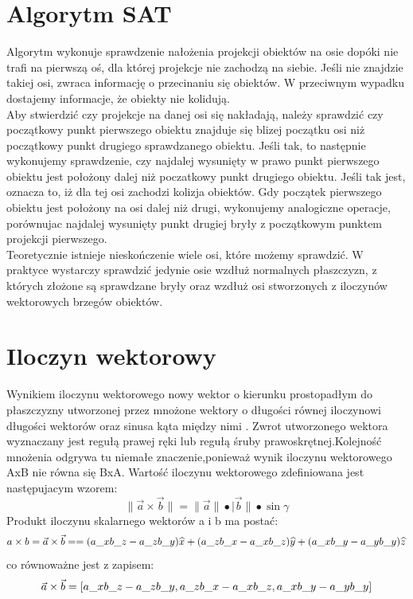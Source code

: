 \section{Algorytm SAT}
Algorytm wykonuje sprawdzenie nałożenia projekcji obiektów na osie dopóki nie trafi na pierwszą oś, dla której projekcje nie zachodzą na siebie. Jeśli nie znajdzie takiej osi, zwraca informację o przecinaniu się obiektów. W przeciwnym wypadku dostajemy informacje, że obiekty nie kolidują. \\
Aby stwierdzić czy projekcje na danej osi się nakładają, należy sprawdzić czy początkowy punkt pierwszego obiektu znajduje się blizej początku osi niż początkowy punkt drugiego sprawdzanego obiektu. Jeśli tak, to następnie wykonujemy sprawdzenie, czy najdalej wysunięty w prawo punkt pierwszego obiektu jest położony dalej niż poczatkowy punkt drugiego obiektu. Jeśli tak jest, oznacza to, iż dla tej osi zachodzi kolizja obiektów. Gdy początek pierwszego obiektu jest położony na osi dalej niż drugi, wykonujemy analogiczne operacje, porównujac najdalej wysunięty punkt drugiej bryły z początkowym punktem projekcji pierwszego. \\
Teoretycznie istnieje nieskończenie wiele osi, które możemy sprawdzić. W praktyce wystarczy sprawdzić jedynie osie wzdłuż normalnych płaszczyzn, z których złożone są sprawdzane bryły oraz wzdłuż osi stworzonych z iloczynów wektorowych brzegów obiektów. 

\section{Iloczyn wektorowy}
Wynikiem iloczynu wektorowego nowy wektor o kierunku prostopadłym do płaszczyzny utworzonej przez mnożone wektory o długości równej iloczynowi długości wektorów oraz sinusa kąta między nimi \cite{math1}. Zwrot utworzonego wektora wyznaczany jest regułą prawej ręki lub regułą śruby prawoskrętnej.Kolejność mnożenia odgrywa tu niemałe znaczenie,ponieważ wynik iloczynu wektorowego AxB nie równa się BxA.
Wartość iloczynu wektorowego zdefiniowana jest następujacym wzorem: \\
\begin{equation}\|\vec{a}\times\vec{b}\|=\|\vec{a}\|\bullet|\vec{b}\|\bullet\sin\gamma\end{equation}
Produkt iloczynu skalarnego wektorów a i b ma postać: \\
\begin{equation}
\centering
a \times b=\vec{a}\times\vec{b}=
=(a\_{x}b\_{z}-a\_{z}b\_{y})\widehat{x}+(a\_{z}b\_{x}-a\_{x}b\_{z})\widehat{y}+(a\_{x}b\_{y}-a\_{y}b\_{y})\widehat{z}
\end{equation}
co równoważne jest z zapisem: \\
\begin{equation}
\centering
\vec{a}\times\vec{b}=[a\_{x}b\_{z}-a\_{z}b\_{y},a\_{z}b\_{x}-a\_{x}b\_{z},a\_{x}b\_{y}-a\_{y}b\_{y}]
\end{equation}
